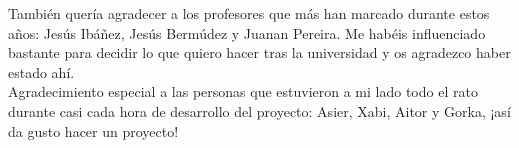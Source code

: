 También quería agradecer a los profesores que más han marcado durante estos años: Jesús Ibáñez, Jesús Bermúdez y Juanan Pereira. Me habéis influenciado bastante para decidir lo que quiero hacer tras la universidad y os agradezco haber estado ahí.\\

Agradecimiento especial a las personas que estuvieron a mi lado todo el rato durante casi cada hora de desarrollo del proyecto: Asier, Xabi, Aitor y Gorka, ¡así da gusto hacer un proyecto!\\
